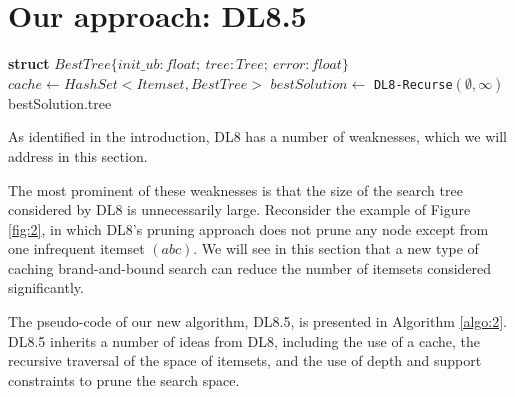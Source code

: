 \section{Our approach: DL8.5}
\newcommand{\trmtt}[1]{\textrm{\texttt{#1}}}
\begin{algorithm}[!ht]\small
	\DontPrintSemicolon
	\caption{$DL8.5(maxdepth, minsup)$}
	\label{algo:2}
	\label{algo:1}
	\textbf{struct} $BestTree\{init\_ub : float;\ tree: Tree;\ error : float\}$\;
	$cache \gets HashSet < Itemset, BestTree >$\;
	$bestSolution \gets$ \verb|DL8-Recurse|$(\emptyset, \infty)$\;
	\Return bestSolution.tree\;
\end{algorithm}

As identified in the introduction, DL8 has a number of weaknesses, which we will address in this section.

The most prominent of these weaknesses is that the size of the search tree considered by DL8 is unnecessarily large. Reconsider the example of Figure \ref{fig:2}, in which DL8’s pruning approach does not prune any node except from one infrequent itemset $(abc)$. We will see in this section that a new type of caching brand-and-bound search can reduce the number of itemsets considered significantly.

The pseudo-code of our new algorithm, DL8.5, is presented in Algorithm \ref{algo:2}. DL8.5 inherits a number of ideas from DL8, including the use of a cache, the recursive traversal of the space of itemsets, and the use of depth and support constraints to prune the search space.

